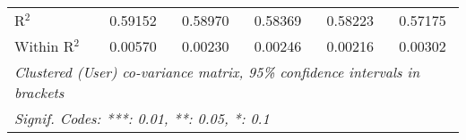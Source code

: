 \begin{table}[htbp]
\begin{threeparttable}[b]
\begin{tabular}{lccccc}
         R$^2$                     & 0.59152          & 0.58970          & 0.58369          & 0.58223          & 0.57175\\  
         Within R$^2$              & 0.00570          & 0.00230          & 0.00246          & 0.00216          & 0.00302\\  
         \midrule \midrule
         \multicolumn{6}{l}{\emph{Clustered (User) co-variance matrix, 95\% confidence intervals in brackets}}\\
         \multicolumn{6}{l}{\emph{Signif. Codes: ***: 0.01, **: 0.05, *: 0.1}}\\
      \end{tabular}
   \end{threeparttable}
\end{table}



